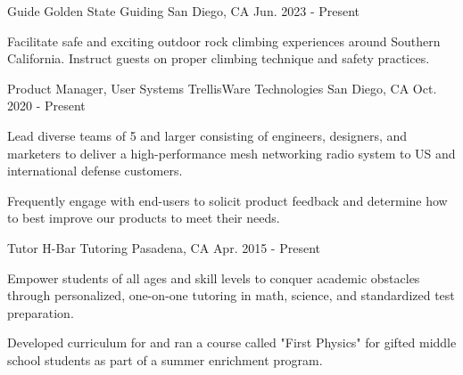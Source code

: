 

\begin{cventries}
  \cventry
    {Guide}
    {Golden State Guiding}
    {San Diego, CA}
    {Jun. 2023 - Present}
    {
      \begin{cvitems}
        \item {Facilitate safe and exciting outdoor rock climbing experiences around Southern California. Instruct guests on proper climbing technique and safety practices.}
      \end{cvitems}
    }


  \cventry
    {Product Manager, User Systems}
    {TrellisWare Technologies}
    {San Diego, CA}
    {Oct. 2020 - Present}
    {
      \begin{cvitems}
      \item {Lead diverse teams of 5 and larger consisting of engineers, designers, and marketers to deliver a high-performance mesh networking radio system to US and international defense customers.}
      \item {Frequently engage with end-users to solicit product feedback and determine how to best improve our products to meet their needs.}
      \end{cvitems}
    }

  \cventry
    {Tutor}
    {H-Bar Tutoring}
    {Pasadena, CA}
    {Apr. 2015 - Present}
    {
      \begin{cvitems}
      \item {Empower students of all ages and skill levels to conquer academic obstacles through personalized, one-on-one tutoring in math, science, and standardized test preparation.}
      \item {Developed curriculum for and ran a course called "First Physics" for gifted middle school students as part of a summer enrichment program.}
      \end{cvitems}
    }




\end{cventries}
